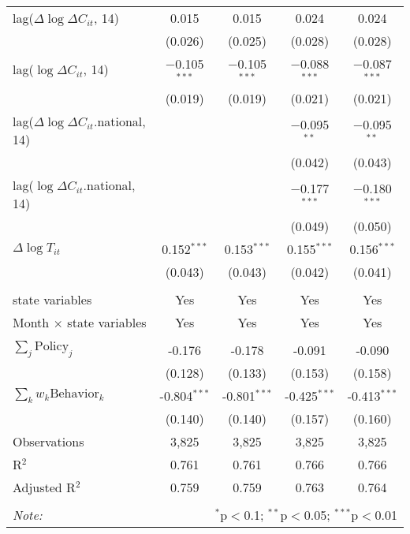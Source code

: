 \begin{tabular}{@{\extracolsep{1pt}}lcccc}
  lag($\Delta \log \Delta C_{it}$, 14) & 0.015 & 0.015 & 0.024 & 0.024 \\ 
  & (0.026) & (0.025) & (0.028) & (0.028) \\ 
  lag($\log \Delta C_{it}$, 14) & $-$0.105$^{***}$ & $-$0.105$^{***}$ & $-$0.088$^{***}$ & $-$0.087$^{***}$ \\ 
  & (0.019) & (0.019) & (0.021) & (0.021) \\ 
  lag($\Delta \log \Delta C_{it}$.national, 14) &  &  & $-$0.095$^{**}$ & $-$0.095$^{**}$ \\ 
  &  &  & (0.042) & (0.043) \\ 
  lag($\log \Delta C_{it}$.national, 14) &  &  & $-$0.177$^{***}$ & $-$0.180$^{***}$ \\ 
  &  &  & (0.049) & (0.050) \\ 
  $\Delta \log T_{it}$ & 0.152$^{***}$ & 0.153$^{***}$ & 0.155$^{***}$ & 0.156$^{***}$ \\ 
  & (0.043) & (0.043) & (0.042) & (0.041) \\ 
 \hline \\[-1.8ex] 
state variables & Yes & Yes & Yes & Yes \\ 
Month $\times$ state variables & Yes & Yes & Yes & Yes \\ 
\hline \\[-1.8ex] 
$\sum_j \mathrm{Policy}_j$ & -0.176 & -0.178 & -0.091 & -0.090 \\ 
 & (0.128) & (0.133) & (0.153) & (0.158) \\ 
$\sum_k w_k \mathrm{Behavior}_k$ & -0.804$^{***}$ & -0.801$^{***}$ & -0.425$^{***}$ & -0.413$^{***}$ \\ 
 & (0.140) & (0.140) & (0.157) & (0.160) \\ 
Observations & 3,825 & 3,825 & 3,825 & 3,825 \\ 
R$^{2}$ & 0.761 & 0.761 & 0.766 & 0.766 \\ 
Adjusted R$^{2}$ & 0.759 & 0.759 & 0.763 & 0.764 \\ 
\hline 
\hline \\[-1.8ex] 
\textit{Note:}  & \multicolumn{4}{r}{$^{*}$p$<$0.1; $^{**}$p$<$0.05; $^{***}$p$<$0.01} \\ 
\end{tabular} 